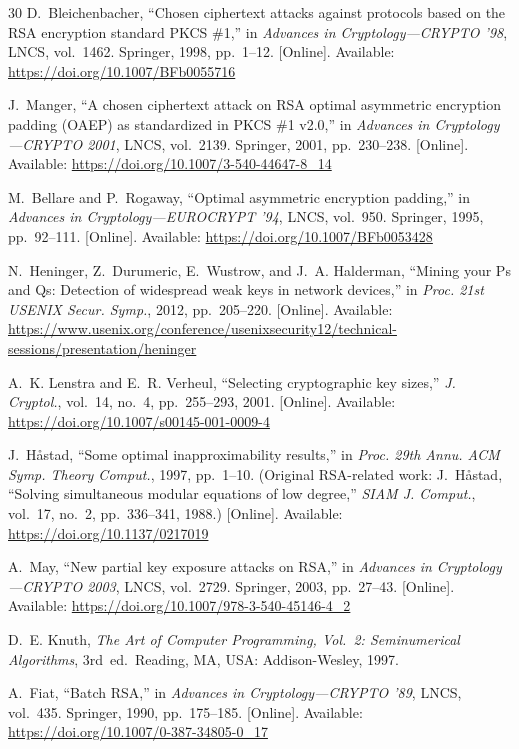 \documentclass[journal]{IEEEtran}
\begin{document}
\begin{thebibliography}{30}
D.~Bleichenbacher, ``Chosen ciphertext attacks against protocols based on the RSA encryption standard PKCS \#1,'' in \textit{Advances in Cryptology---CRYPTO '98}, LNCS, vol.~1462. Springer, 1998, pp.~1--12. [Online]. Available: \url{https://doi.org/10.1007/BFb0055716}

J.~Manger, ``A chosen ciphertext attack on RSA optimal asymmetric encryption padding (OAEP) as standardized in PKCS \#1 v2.0,'' in \textit{Advances in Cryptology---CRYPTO 2001}, LNCS, vol.~2139. Springer, 2001, pp.~230--238. [Online]. Available: \url{https://doi.org/10.1007/3-540-44647-8_14}

M.~Bellare and P.~Rogaway, ``Optimal asymmetric encryption padding,'' in \textit{Advances in Cryptology---EUROCRYPT '94}, LNCS, vol.~950. Springer, 1995, pp.~92--111. [Online]. Available: \url{https://doi.org/10.1007/BFb0053428}

N.~Heninger, Z.~Durumeric, E.~Wustrow, and J.~A. Halderman, ``Mining your Ps and Qs: Detection of widespread weak keys in network devices,'' in \textit{Proc. 21st USENIX Secur. Symp.}, 2012, pp.~205--220. [Online]. Available: \url{https://www.usenix.org/conference/usenixsecurity12/technical-sessions/presentation/heninger}

A.~K. Lenstra and E.~R. Verheul, ``Selecting cryptographic key sizes,'' \textit{J. Cryptol.}, vol.~14, no.~4, pp.~255--293, 2001. [Online]. Available: \url{https://doi.org/10.1007/s00145-001-0009-4}

J.~H{\aa}stad, ``Some optimal inapproximability results,'' in \textit{Proc. 29th Annu. ACM Symp. Theory Comput.}, 1997, pp.~1--10. (Original RSA-related work: J.~H{\aa}stad, ``Solving simultaneous modular equations of low degree,'' \textit{SIAM J. Comput.}, vol.~17, no.~2, pp.~336--341, 1988.) [Online]. Available: \url{https://doi.org/10.1137/0217019}

A.~May, ``New partial key exposure attacks on RSA,'' in \textit{Advances in Cryptology---CRYPTO 2003}, LNCS, vol.~2729. Springer, 2003, pp.~27--43. [Online]. Available: \url{https://doi.org/10.1007/978-3-540-45146-4_2}

D.~E. Knuth, \textit{The Art of Computer Programming, Vol.~2: Seminumerical Algorithms}, 3rd~ed.\ Reading, MA, USA: Addison-Wesley, 1997.

A.~Fiat, ``Batch RSA,'' in \textit{Advances in Cryptology---CRYPTO '89}, LNCS, vol.~435. Springer, 1990, pp.~175--185. [Online]. Available: \url{https://doi.org/10.1007/0-387-34805-0_17}


\end{thebibliography}
\end{document}
